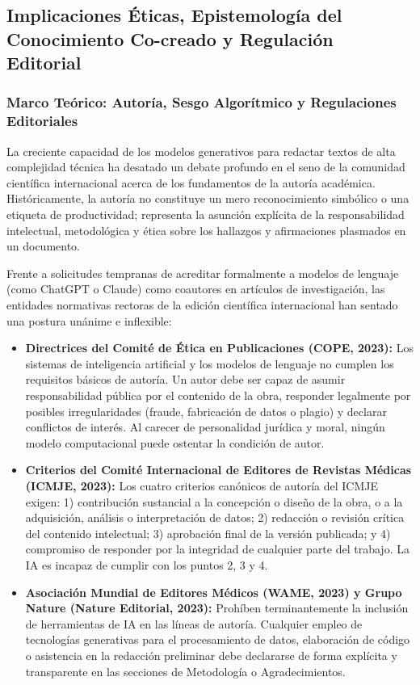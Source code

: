 \subsection{Implicaciones Éticas, Epistemología del Conocimiento Co-creado y Regulación Editorial}

\subsubsection{Marco Teórico: Autoría, Sesgo Algorítmico y Regulaciones Editoriales}

La creciente capacidad de los modelos generativos para redactar textos de alta complejidad técnica ha desatado un debate profundo en el seno de la comunidad científica internacional acerca de los fundamentos de la autoría académica. Históricamente, la autoría no constituye un mero reconocimiento simbólico o una etiqueta de productividad; representa la asunción explícita de la responsabilidad intelectual, metodológica y ética sobre los hallazgos y afirmaciones plasmados en un documento.

Frente a solicitudes tempranas de acreditar formalmente a modelos de lenguaje (como ChatGPT o Claude) como coautores en artículos de investigación, las entidades normativas rectoras de la edición científica internacional han sentado una postura unánime e inflexible:
\begin{itemize}
    \item \textbf{Directrices del Comité de Ética en Publicaciones (COPE, 2023):} Los sistemas de inteligencia artificial y los modelos de lenguaje no cumplen los requisitos básicos de autoría. Un autor debe ser capaz de asumir responsabilidad pública por el contenido de la obra, responder legalmente por posibles irregularidades (fraude, fabricación de datos o plagio) y declarar conflictos de interés. Al carecer de personalidad jurídica y moral, ningún modelo computacional puede ostentar la condición de autor.
    \item \textbf{Criterios del Comité Internacional de Editores de Revistas Médicas (ICMJE, 2023):} Los cuatro criterios canónicos de autoría del ICMJE exigen: 1) contribución sustancial a la concepción o diseño de la obra, o a la adquisición, análisis o interpretación de datos; 2) redacción o revisión crítica del contenido intelectual; 3) aprobación final de la versión publicada; y 4) compromiso de responder por la integridad de cualquier parte del trabajo. La IA es incapaz de cumplir con los puntos 2, 3 y 4.
    \item \textbf{Asociación Mundial de Editores Médicos (WAME, 2023) y Grupo Nature (Nature Editorial, 2023):} Prohíben terminantemente la inclusión de herramientas de IA en las líneas de autoría. Cualquier empleo de tecnologías generativas para el procesamiento de datos, elaboración de código o asistencia en la redacción preliminar debe declararse de forma explícita y transparente en las secciones de Metodología o Agradecimientos.
\end{itemize}

